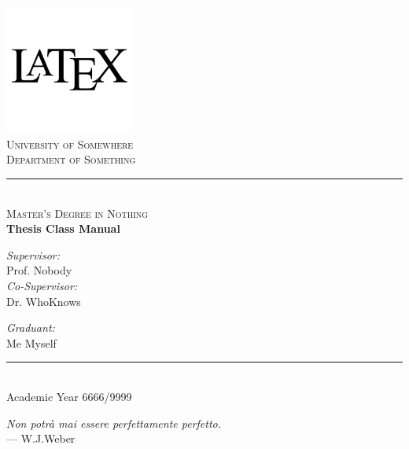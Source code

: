 \documentclass[12pt,a4papertwoside,openright,cleardoublepage=empty]{article}
\newcommand\blankpage{%
     \null
     \thispagestyle{empty}%
     \newpage}
\begin{document}
    \pagestyle{empty}
    \centering
    \includegraphics[width=0.32\textwidth]{latex.png}\\
    \vspace{0.5cm}
    {\scshape\Large University of Somewhere \\}
    \vspace{0.1cm}
    \vspace{0.1cm}
    {\scshape\large Department of Something\\}
    \rule{\linewidth}{0.9pt}\\
    \vspace{0.1cm}
    {\scshape\large Master's Degree in Nothing\\}
    \vfill
    {\Huge\bfseries Thesis Class Manual \\}
    \vfill
    
    \begin{minipage}[t]{6cm}
        \flushleft
        {\Large \textit{Supervisor:}} \\
        \vspace{0.1cm}
        {\Large Prof. Nobody}\\
        \vspace{0.3cm}
        {\Large \textit{Co-Supervisor:}} \\
        \vspace{0.1cm}
        {\Large Dr. WhoKnows}\\
    \end{minipage}
    \hfill
    \begin{minipage}[t]{5cm}
        \flushright
        {\Large \textit{Graduant:}} \\
        \vspace{0.1cm}
        {\Large Me Myself} \\
    \end{minipage}
    
    \vspace{1.1cm}
    \rule{\linewidth}{0.8pt}\\
    \vspace{0.4cm}
    \centering
    {\large Academic Year 6666/9999}

    \afterpage{\blankpage}
    \newpage

    \vspace*{4cm}

    \centering
    \emph{Non potrà mai essere perfettamente perfetto.} \\
    \medskip
    --- W.J.Weber   
\end{document}
